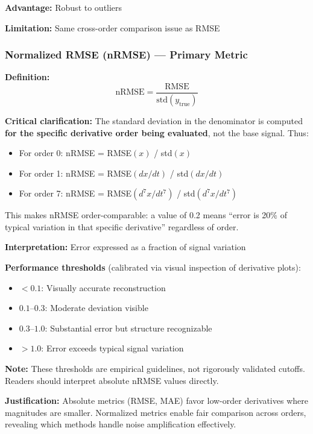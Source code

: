 \textbf{Advantage:} Robust to outliers

\textbf{Limitation:} Same cross-order comparison issue as RMSE

\subsubsection{Normalized RMSE (nRMSE) --- Primary Metric}

\textbf{Definition:}
\begin{equation}
\text{nRMSE} = \frac{\text{RMSE}}{\text{std}(y_{\text{true}})}
\end{equation}

\textbf{Critical clarification:} The standard deviation in the denominator is computed \textbf{for the specific derivative order being evaluated}, not the base signal. Thus:
\begin{itemize}
    \item For order 0: nRMSE = RMSE$(x)$ / std$(x)$
    \item For order 1: nRMSE = RMSE$(dx/dt)$ / std$(dx/dt)$
    \item For order 7: nRMSE = RMSE$(d^7x/dt^7)$ / std$(d^7x/dt^7)$
\end{itemize}

This makes nRMSE order-comparable: a value of 0.2 means ``error is 20\% of typical variation in that specific derivative'' regardless of order.

\textbf{Interpretation:} Error expressed as a fraction of signal variation

\textbf{Performance thresholds} (calibrated via visual inspection of derivative plots):
\begin{itemize}
    \item $< 0.1$: Visually accurate reconstruction
    \item $0.1$--$0.3$: Moderate deviation visible
    \item $0.3$--$1.0$: Substantial error but structure recognizable
    \item $> 1.0$: Error exceeds typical signal variation
\end{itemize}

\textbf{Note:} These thresholds are empirical guidelines, not rigorously validated cutoffs. Readers should interpret absolute nRMSE values directly.

\textbf{Justification:} Absolute metrics (RMSE, MAE) favor low-order derivatives where magnitudes are smaller. Normalized metrics enable fair comparison across orders, revealing which methods handle noise amplification effectively.

